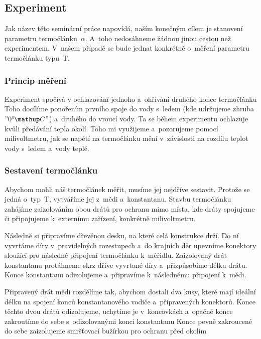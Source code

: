 \subsection{Experiment}
Jak název této seminární práce napovídá, naším konečným cílem je stanovení
parametru termočlánku~$\alpha$. A~toho nedosáhneme žádnou jinou cestou než
experimentem. V~našem případě se bude jednat konkrétně o~měření parametru
termočlánku typu~T.

\subsubsection{Princip měření}
Experiment spočívá v ochlazování jednoho a~ohřívání druhého konce termočlánku%
 Toho docílíme ponořením prvního
spoje do vody s~ledem (kde udržujeme zhruba~$"0 \C"$) a~druhého do vroucí vody.
Ta se během experimentu ochlazuje kvůli předávání tepla okolí. Toho mi
využijeme a~pozorujeme pomocí milivoltmetru, jak se napětí na termočlánku
mění v~závislosti na rozdílu teplot vody s~ledem a~vody teplé.

\subsubsection{Sestavení termočlánku}
Abychom mohli náš termočlánek měřit, musíme jej nejdříve sestavit. Protože se
jedná o~typ~T, vytváříme jej z~mědi a~konstantanu. Stavbu termočlánku
zahájíme zaizolováním obou drátů pro ochranu mimo místa, kde dráty spojujeme
či připojujeme k~externímu zařízení, konkrétně milivoltmetru.

Následně si připravíme dřevěnou desku, na které celá konstrukce drží.
Do ní vyvrtáme díry v~pravidelných rozestupech a~do krajních děr upevníme
konektory sloužící pro následné připojení termočlánku k~měřidlu. Zaizolovaný
drát konstantanu protáhneme skrz dříve vyvrtané díry a~přizpůsobíme
délku drátu. Konce konstantanu odizolujeme a~připravíme k~následnému
připojení k~mědi.

Připravený drát mědi rozdělíme tak, abychom dostali dva kusy, které mají
ideální délku na spojení konců konstantanového vodiče a~připravených konektorů.
Konce těchto dvou drátů odizolujeme, uchytíme je v~koncovkách a~opačné
konce zakroutíme do sebe s~odizolovanými konci konstantanu%
Konce pevně zakroucené do sebe zaizolujeme smršťovací bužírkou pro ochranu
před okolím

